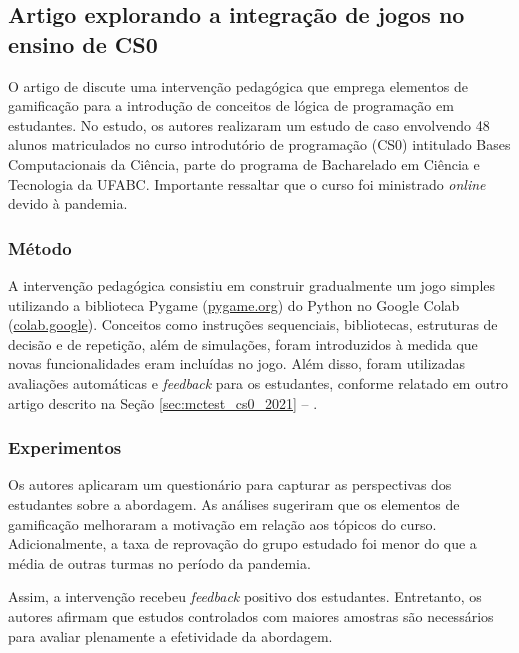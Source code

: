 \subsection{Artigo explorando a integração de jogos no ensino de CS0}

O artigo de  discute uma intervenção pedagógica que emprega elementos de gamificação para a introdução de conceitos de lógica de programação em estudantes. No estudo, os autores realizaram um estudo de caso envolvendo 48 alunos matriculados no curso introdutório de programação (CS0) intitulado Bases Computacionais da Ciência, parte do programa de Bacharelado em Ciência e Tecnologia da UFABC. Importante ressaltar que o curso foi ministrado \textit{online} devido à pandemia.

\subsubsection{Método}

A intervenção pedagógica consistiu em construir gradualmente um jogo simples utilizando a biblioteca Pygame (\href{https://www.pygame.org/news}{pygame.org}) do Python no Google Colab (\href{https://colab.google/}{colab.google}). Conceitos como instruções sequenciais, bibliotecas, estruturas de decisão e de repetição, além de simulações, foram introduzidos à medida que novas funcionalidades eram incluídas no jogo. Além disso, foram utilizadas avaliações automáticas e \textit{feedback} para os estudantes, conforme relatado em outro artigo descrito na Seção \ref{sec:mctest_cs0_2021} -- .

\subsubsection{Experimentos}

Os autores aplicaram um questionário para capturar as perspectivas dos estudantes sobre a abordagem. As análises sugeriram que os elementos de gamificação melhoraram a motivação em relação aos tópicos do curso. Adicionalmente, a taxa de reprovação do grupo estudado foi menor do que a média de outras turmas no período da pandemia.

Assim, a intervenção recebeu \textit{feedback} positivo dos estudantes. Entretanto, os autores afirmam que estudos controlados com maiores amostras são necessários para avaliar plenamente a efetividade da abordagem. 


